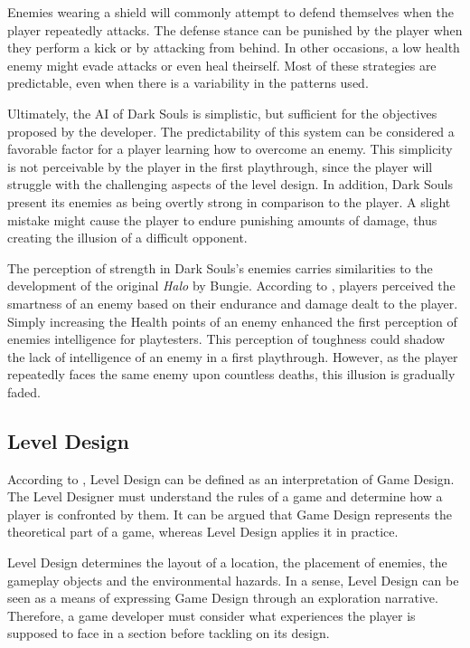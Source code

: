 \documentclass[cic,tc,english]{iiufrgs}
\begin{document}
Enemies wearing a shield will commonly attempt to defend themselves when the player repeatedly attacks. The defense stance can be punished by the player when they perform a kick or by attacking from behind. In other occasions, a low health enemy might evade attacks or even heal theirself. Most of these strategies are predictable, even when there is a variability in the patterns used.

Ultimately, the AI of Dark Souls is simplistic, but sufficient for the objectives proposed by the developer. The predictability of this system can be considered a favorable factor for a player learning how to overcome an enemy. This simplicity is not perceivable by the player in the first playthrough, since the player will struggle with the challenging aspects of the level design. In addition, Dark Souls present its enemies as being overtly strong in comparison to the player. A slight mistake might cause the player to endure punishing amounts of damage, thus creating the illusion of a difficult opponent.

The perception of strength in Dark Souls's enemies carries similarities to the development of the original \emph{Halo} by Bungie. According to , players perceived the smartness of an enemy based on their endurance and damage dealt to the player. Simply increasing the Health points of an enemy enhanced the first perception of enemies intelligence for playtesters. This perception of toughness could shadow the lack of intelligence of an enemy in a first playthrough. However, as the player repeatedly faces the same enemy upon countless deaths, this illusion is gradually faded.

\subsection{Level Design}

According to \cite{BOOK_LevelDesignConcept}, Level Design can be defined as an interpretation of Game Design. The Level Designer must understand the rules of a game and determine how a player is confronted by them. It can be argued that Game Design represents the theoretical part of a game, whereas Level Design applies it in practice.

Level Design determines the layout of a location, the placement of enemies, the gameplay objects and the environmental hazards. In a sense, Level Design can be seen as a means of expressing Game Design through an exploration narrative. Therefore, a game developer must consider what experiences the player is supposed to face in a section before tackling on its design.
\end{document}
